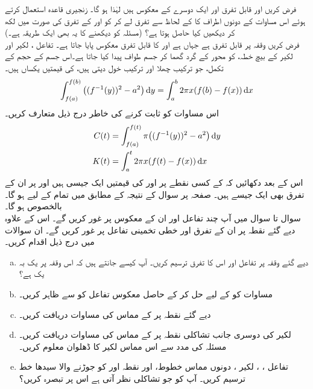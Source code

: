 فرض کریں  اور  قابل تفرق اور ایک دوسرے کے معکوس ہیں لہٰذا  ہو گا۔ زنجیری قاعدہ استعمال کرتے ہوئے اس مساوات کے دونوں اطراف کا  کے لحاظ سے  تفرق لے کر   کو  اور  کے تفرق کی صورت میں لکھ کر دیکھیں  کیا حاصل ہوتا ہے؟ (مسئلہ  کو دیکھنے کا یہ بھی ایک طریقہ ہے۔)
\\
فرض کریں وقفہ  پر  قابل تفرق ہے جہاں  ہے اور  کا قابل تفرق معکوس  پایا جاتا ہے۔ تفاعل ،  لکیر  اور لکیر  کے بیچ خطہ، کو محور  کے گرد گھما کر جسم طواف پیدا کیا جاتا ہے۔اس جسم کے حجم کے  تکمل، جو  ترکیب چھلا اور ترکیب خول     دیتی ہیں، کی قیمتیں یکساں ہیں۔
\begin{align*}
\int_{f(a)}^{f(b)}\big((f^{-1}(y))^2-a^2\big)\dif y=\int_a^b2\pi x(f(b)-f(x))\dif x
\end{align*}
اس مساوات کو ثابت کرنے کی خاطر درج ذیل متعارف کریں۔
\begin{align*}
C(t)&=\int_{f(a)}^{f(t)}\pi\big((f^{-1}(y))^2-a^2\big)\dif y\\
K(t)&=\int_a^t2\pi x(f(t)-f(x))\dif x
\end{align*}
اس کے بعد دکھائیں کہ  کے کسی نقطے  پر  اور  کی قیمتیں ایک جیسی ہیں اور  پر ان کے تفرق بھی ایک جیسے ہیں۔ صفحہ  پر سوال  کے نتیجہ کے  مطابق  میں تمام  کے لیے  ہو گا۔ بالخصوص  ہو گا۔
\\
سوال  تا سوال  میں آپ چند تفاعل اور ان کے معکوس پر غور کریں گے۔ اس کے علاوہ دیے گئے نقطہ پر ان کے تفرق اور خطی تخمینی تفاعل  پر غور کریں گے۔ ان سوالات میں درج ذیل اقدام کریں۔ 
\begin{enumerate}[a.]
\item
دیے گئے وقفہ پر تفاعل  اور اس کا تفرق ترسیم کریں۔ آپ کیسے جانتے ہیں کہ اس وقفہ پر  یک بہ یک ہے؟
\item
مساوات  کو  کے لیے حل کر کے حاصل معکوس تفاعل کو  سے ظاہر کریں۔
\item
دیے گئے نقطہ  پر  کے مماس کی مساوات دریافت کریں۔
\item
لکیر  کی  دوسری جانب تشاکلی نقطہ  پر  کے مماس کی مساوات دریافت کریں۔ مسئلہ  کی مدد سے اس مماس لکیر کا ڈھلوان معلوم کریں۔
\item
تفاعل ، ، لکیر ، دونوں مماس خطوط،  اور نقطہ  اور  کو جوڑنے والا سیدھا خط ترسیم کریں۔ آپ کو جو تشاکلی نظر آتی ہے اس پر تبصرہ کریں؟
\end{enumerate}
